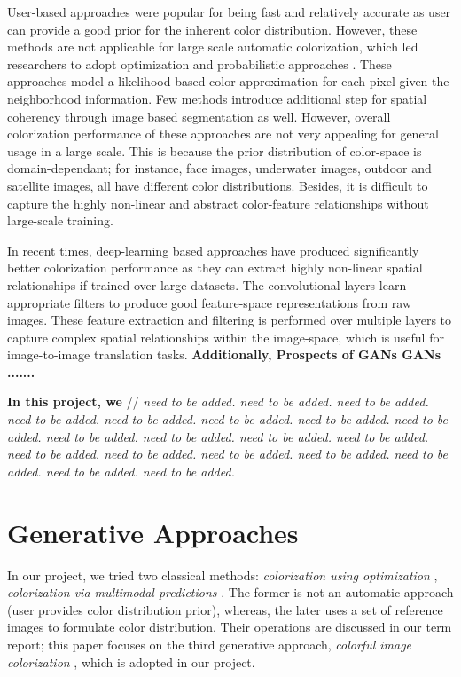 \documentclass{article} %
\begin{document}
User-based approaches \cite{levin2004colorization, konushin2006interactive, reinhard2001color, vrhel1992color} were popular for being fast and relatively accurate as user can provide a good prior for the inherent color distribution. However, these methods are not applicable for large scale automatic colorization, which led researchers to adopt optimization and probabilistic approaches \cite{charpiat2008automatic, bugeau2014variational, lagodzinski2008digital}. 
These approaches model a likelihood based color approximation for each pixel given the neighborhood information. 
Few methods introduce additional step for spatial coherency through image based segmentation as well. However, overall colorization performance of these approaches are not very appealing \cite{deshpande2015learning} for general usage in a large scale. This is because the prior distribution of color-space is domain-dependant; for instance, face images, underwater images, outdoor and satellite images, all have different color distributions. Besides, it is difficult to capture the highly non-linear and abstract color-feature relationships without large-scale training. 

In recent times, deep-learning based approaches \cite{zhang2016colorful, cheng2015deep, varga2016fully, li2017watergan} have produced significantly better colorization performance as they can extract highly non-linear spatial relationships if trained over large datasets. 
The convolutional layers learn appropriate filters to produce good feature-space representations from raw images. These feature extraction and filtering is performed over multiple layers 
to capture complex spatial relationships within the image-space, which is useful for image-to-image translation tasks. \textbf{Additionally,  Prospects of GANs GANs .......}

\textbf{In this project, we } 
// \textit{need to be added. need to be added. need to be added. need to be added. need to be added. need to be added. need to be added. need to be added.
need to be added. need to be added. need to be added. need to be added. need to be added. need to be added.
need to be added. need to be added. need to be added. need to be added. need to be added.}  

\section{Generative Approaches}
In our project, we tried two classical methods: \textit{colorization using optimization} \cite{levin2004colorization}, \textit{colorization via multimodal predictions} \cite{charpiat2008automatic}. The former is not an automatic approach (user provides color distribution prior), whereas, the later uses a set of reference images to formulate color distribution. Their operations are discussed in our term report; this paper focuses on the third generative approach, \textit{colorful image colorization} \cite{zhang2016colorful}, which is adopted in our project. 
\end{document}
